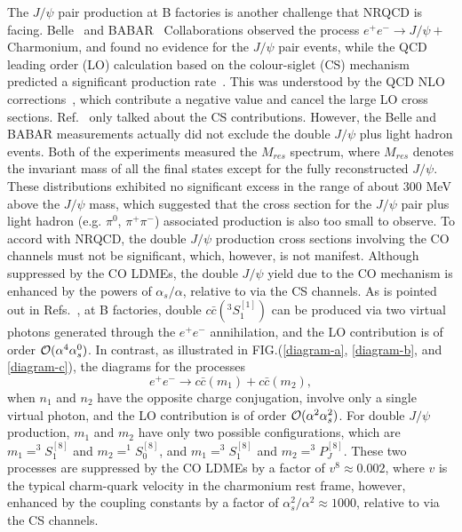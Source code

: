 \documentclass[preprint,showpacs,preprintnumbers,amssymb,aps]{revtex4}
\def\be{\begin{equation}}
\def\ee{\end{equation}}
\begin{document}
The $J/\psi$ pair production at B factories is another challenge that NRQCD is facing.
Belle~\cite{Abe:2004ww} and BABAR~\cite{Aubert:2005tj} Collaborations observed the process $e^+e^-\rightarrow J/\psi+$Charmonium,
and found no evidence for the $J/\psi$ pair events,
while the QCD leading order (LO) calculation based on the colour-siglet (CS) mechanism predicted a significant production rate~\cite{Bodwin:2002fk, Bodwin:2002kk}.
This was understood by the QCD NLO corrections~\cite{Gong:2008ce}, which contribute a negative value and cancel the large LO cross sections.
Ref.~\cite{Gong:2008ce} only talked about the CS contributions.
However, the Belle and BABAR measurements actually did not exclude the double $J/\psi$ plus light hadron events.
Both of the experiments measured the $M_{res}$ spectrum,
where $M_{res}$ denotes the invariant mass of all the final states except for the fully reconstructed $J/\psi$.
These distributions exhibited no significant excess in the range of about 300 MeV above the $J/\psi$ mass,
which suggested that the cross section for the $J/\psi$ pair plus light hadron (e.g. $\pi^0$, $\pi^+\pi^-$) associated production is also too small to observe.
To accord with NRQCD, the double $J/\psi$ production cross sections involving the CO channels must not be significant,
which, however, is not manifest.
Although suppressed by the CO LDMEs,
the double $J/\psi$ yield due to the CO mechanism is enhanced by the powers of $\alpha_s/\alpha$, relative to via the CS channels.
As is pointed out in Refs.~\cite{Bodwin:2002fk, Gong:2008ce}, at B factories,
double $c\bar{c}(^3S_1^{[1]})$ can be produced via two virtual photons generated through the $e^+e^-$ annihilation,
and the LO contribution is of order ${\cal O}(\alpha^4\alpha_s^0)$.
In contrast, as illustrated in FIG.(\ref{diagram-a}, \ref{diagram-b}, and \ref{diagram-c}),
the diagrams for the processes
\be
e^+e^-\rightarrow c\bar{c}(m_1)+c\bar{c}(m_2), \label{eqn:process1}
\ee
when $n_1$ and $n_2$ have the opposite charge conjugation,
involve only a single virtual photon,
and the LO contribution is of order ${\cal O}(\alpha^2\alpha_s^2)$.
For double $J/\psi$ production, $m_1$ and $m_2$ have only two possible configurations,
which are $m_1=^3S_1^{[8]}$ and $m_2=^1S_0^{[8]}$, and $m_1=^3S_1^{[8]}$ and $m_2=^3P_J^{[8]}$.
These two processes are suppressed by the CO LDMEs by a factor of $v^8\approx 0.002$,
where $v$ is the typical charm-quark velocity in the charmonium rest frame,
however, enhanced by the coupling constants by a factor of $\alpha_s^2/\alpha^2\approx 1000$,
relative to via the CS channels.
\end{document}
